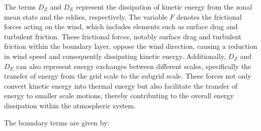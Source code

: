 The terms \( D_Z \) and \( D_E \) represent the dissipation of kinetic energy from the zonal mean state and the eddies, respectively. The variable \( F \) denotes the frictional forces acting on the wind, which includes elements such as surface drag and turbulent friction. These frictional forces, notably surface drag and turbulent friction within the boundary layer, oppose the wind direction, causing a reduction in wind speed and consequently dissipating kinetic energy. Additionally, \( D_Z \) and \( D_E \) can also represent energy exchanges between different scales, specifically the transfer of energy from the grid scale to the subgrid scale. These forces not only convert kinetic energy into thermal energy but also facilitate the transfer of energy to smaller scale motions, thereby contributing to the overall energy dissipation within the atmospheric system.


The boundary terms are given by:


